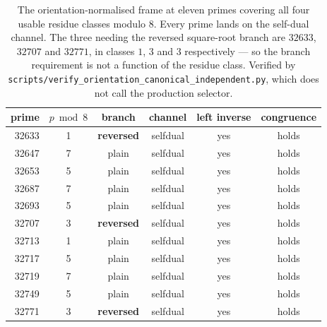 \begin{table}[t]
\centering
\small
\begin{tabular}{rccccc}
\hline
prime & $p \bmod 8$ & branch & channel & left inverse & congruence \\
\hline
32633 & 1 & \textbf{reversed} & selfdual & yes & holds \\
32647 & 7 & plain & selfdual & yes & holds \\
32653 & 5 & plain & selfdual & yes & holds \\
32687 & 7 & plain & selfdual & yes & holds \\
32693 & 5 & plain & selfdual & yes & holds \\
32707 & 3 & \textbf{reversed} & selfdual & yes & holds \\
32713 & 1 & plain & selfdual & yes & holds \\
32717 & 5 & plain & selfdual & yes & holds \\
32719 & 7 & plain & selfdual & yes & holds \\
32749 & 5 & plain & selfdual & yes & holds \\
32771 & 3 & \textbf{reversed} & selfdual & yes & holds \\
\hline
\end{tabular}
\caption{The orientation-normalised frame at eleven primes covering all four usable residue classes modulo $8$. Every prime lands on the self-dual channel. The three needing the reversed square-root branch are $32633$, $32707$ and $32771$, in classes $1$, $3$ and $3$ respectively --- so the branch requirement is not a function of the residue class. Verified by \texttt{scripts/verify\_orientation\_canonical\_independent.py}, which does not call the production selector.}
\label{tab:orientation}
\end{table}
